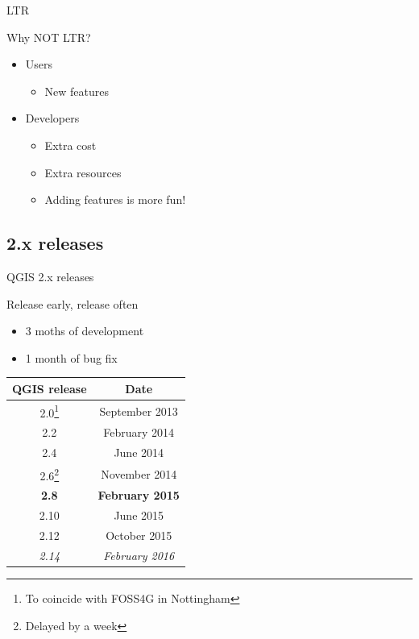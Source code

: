 \begin{frame}{LTR}
	\begin{block}{Why NOT LTR?}
		\begin{itemize}
			\item Users
				\begin{itemize}
					\item New features
				\end{itemize}		
			\item Developers 
				\begin{itemize}
					\item Extra cost
					\item Extra resources
					\item Adding features is more fun!
				\end{itemize}
		\end{itemize}
	\end{block}
\end{frame}

\subsection{2.x releases}
\begin{frame}{QGIS 2.x releases}
	\begin{block}{Release early, release often}
		\begin{itemize}
			\item 3 moths of development
			\item 1 month of bug fix
		\end{itemize}
	\end{block}
	\begin{center}

	\begin{tabular}{|c|c|}
		\hline QGIS release & Date \\ 
		\hline 2.0\footnote{To coincide with FOSS4G in Nottingham} & September 2013 \\ 
		\hline 2.2 & February 2014 \\ 
		\hline 2.4 & June 2014 \\ 
		\hline 2.6\footnote{Delayed by a week} & November 2014 \\ 
		\hline {\color{red}\textbf{2.8}} & {\color{red}\textbf{February 2015}} \\ 
		\hline 2.10 & June 2015 \\ 
		\hline 2.12 & October 2015 \\ 
		\hline {\color{red} \textit{2.14}} & {\color{red}\textit{February 2016}} \\ 
		\hline 
	\end{tabular} 
	\end{center} 
\end{frame}


